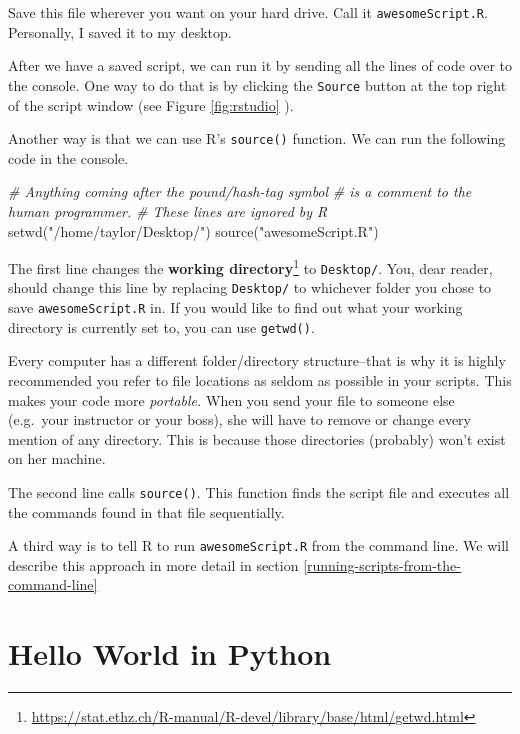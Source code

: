 \documentclass[
  12pt,
]{krantz}
\makeatletter
\newenvironment{Shaded}{\begin{snugshade}}{\end{snugshade}}
\newcommand{\CommentTok}[1]{\textcolor[rgb]{0.37,0.37,0.37}{\textit{#1}}}
\newcommand{\FunctionTok}[1]{\textcolor[rgb]{0,0,0}{#1}}
\newcommand{\NormalTok}[1]{#1}
\newcommand{\StringTok}[1]{\textcolor[rgb]{0.5,0.5,0.5}{#1}}
\renewcommand{\href}[2]{#2\footnote{\url{#1}}}
\newenvironment{kframe}{%
\medskip{}
\setlength{\fboxsep}{.8em}
 \def\at@end@of@kframe{}%
 \ifinner\ifhmode%
  \def\at@end@of@kframe{\end{minipage}}%
  \begin{minipage}{\columnwidth}%
 \fi\fi%
 \def\FrameCommand##1{\hskip\@totalleftmargin \hskip-\fboxsep
 \colorbox{shadecolor}{##1}\hskip-\fboxsep
     \hskip-\linewidth \hskip-\@totalleftmargin \hskip\columnwidth}%
 \MakeFramed {\advance\hsize-\width
   \@totalleftmargin\z@ \linewidth\hsize
   \@setminipage}}%
 {\par\unskip\endMakeFramed%
 \at@end@of@kframe}
\renewenvironment{Shaded}{\begin{kframe}}{\end{kframe}}
\makeatother
\begin{document}
Save this file wherever you want on your hard drive. Call it \texttt{awesomeScript.R}. Personally, I saved it to my desktop.

After we have a saved script, we can run it by sending all the lines of code over to the console. One way to do that is by clicking the \texttt{Source} button at the top right of the script window (see Figure \ref{fig:rstudio} ).

Another way is that we can use R's \texttt{source()} function. We can run the following code in the console.

\begin{Shaded}
\begin{Highlighting}[]
\CommentTok{\# Anything coming after the pound/hash{-}tag symbol }
\CommentTok{\# is a comment to the human programmer.}
\CommentTok{\# These lines are ignored by R}
\FunctionTok{setwd}\NormalTok{(}\StringTok{"/home/taylor/Desktop/"}\NormalTok{)}
\FunctionTok{source}\NormalTok{(}\StringTok{"awesomeScript.R"}\NormalTok{)}
\end{Highlighting}
\end{Shaded}

The first line changes the \href{https://stat.ethz.ch/R-manual/R-devel/library/base/html/getwd.html}{\textbf{working directory}} to \texttt{Desktop/}. You, dear reader, should change this line by replacing \texttt{Desktop/} to whichever folder you chose to save \texttt{awesomeScript.R} in. If you would like to find out what your working directory is currently set to, you can use \texttt{getwd()}.

Every computer has a different folder/directory structure--that is why it is highly recommended you refer to file locations as seldom as possible in your scripts. This makes your code more \emph{portable.} When you send your file to someone else (e.g.~your instructor or your boss), she will have to remove or change every mention of any directory. This is because those directories (probably) won't exist on her machine.

The second line calls \texttt{source()}. This function finds the script file and executes all the commands found in that file sequentially.

A third way is to tell R to run \texttt{awesomeScript.R} from the command line. We will describe this approach in more detail in section \ref{running-scripts-from-the-command-line}

\hypertarget{hello-world-in-python}{%
\section{Hello World in Python}\label{hello-world-in-python}}
\end{document}
